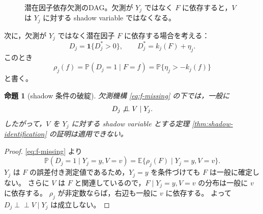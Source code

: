 \documentclass[dvipdfmx,autodetect-engine]{jsarticle}
\newtheorem{proposition}{命題}
\newcommand{\indep}{\mathrel{\perp\!\!\!\perp}}
\newcommand{\E}{\mathbb{E}}
\newcommand{\Prb}{\mathbb{P}}
\newcommand{\1}{\mathbf{1}}
\begin{document}
\begin{figure}[tbp]
\centering
{}
\caption{潜在因子依存欠測のDAG。欠測が $Y_j$ ではなく $F$ に依存すると，$V$ は $Y_j$ に対する shadow variable ではなくなる。}
\label{fig:dag-f-missing}
\end{figure}


次に，欠測が $Y_j$ ではなく潜在因子 $F$ に依存する場合を考える：
\begin{equation}
  D_j = \1\{D_j^*>0\},
  \qquad
  D_j^* = k_j(F)+\eta_j.
  \label{eq:f-missing}
\end{equation}
このとき
\begin{equation}
  \rho_j(f)=\Prb(D_j=1\mid F=f)
  =\Prb\{\eta_j>-k_j(f)\}
  \label{eq:rho-f}
\end{equation}
と書く。

\begin{proposition}[shadow 条件の破綻]
\label{prop:f-missing-not-shadow}
欠測機構 \eqref{eq:f-missing} の下では，一般に
\begin{equation}
  D_j \not\indep V\mid Y_j.
  \label{eq:not-shadow}
\end{equation}
したがって，$V$ を $Y_j$ に対する shadow variable とする定理 \ref{thm:shadow-identification} の証明は適用できない。
\end{proposition}

\begin{proof}
\eqref{eq:f-missing} より
\begin{equation}
  \Prb(D_j=1\mid Y_j=y,V=v)
  = \E\{\rho_j(F)\mid Y_j=y,V=v\}.
  \label{eq:f-missing-cond-prob}
\end{equation}
$Y_j$ は $F$ の誤差付き測定値であるため，$Y_j=y$ を条件づけても $F$ は一般に確定しない。
さらに $V$ は $F$ と関連しているので，$F\mid Y_j=y,V=v$ の分布は一般に $v$ に依存する。
$\rho_j$ が非定数ならば，右辺も一般に $v$ に依存する。
よって $D_j\indep V\mid Y_j$ は成立しない。
\end{proof}
\end{document}

